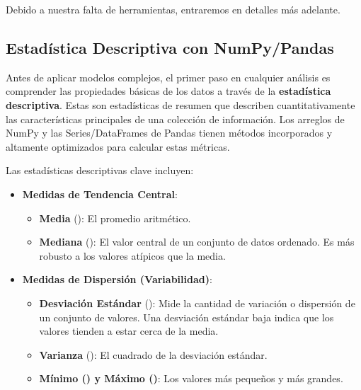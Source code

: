 \noindent Debido a nuestra falta de herramientas, entraremos en detalles más adelante.

\subsection{Estadística Descriptiva con NumPy/Pandas}
\label{subsec:descriptive_stats}
Antes de aplicar modelos complejos, el primer paso en cualquier análisis es comprender las propiedades básicas de los datos a través de la \textbf{estadística descriptiva}. Estas son estadísticas de resumen que describen cuantitativamente las características principales de una colección de información. Los arreglos de NumPy y las Series/DataFrames de Pandas tienen métodos incorporados y altamente optimizados para calcular estas métricas.

Las estadísticas descriptivas clave incluyen:
\begin{itemize}
    \item \textbf{Medidas de Tendencia Central}:
    \begin{itemize}
        \item \textbf{Media} (): El promedio aritmético.
        \item \textbf{Mediana} (): El valor central de un conjunto de datos ordenado. Es más robusto a los valores atípicos que la media.
    \end{itemize}
    \item \textbf{Medidas de Dispersión (Variabilidad)}:
    \begin{itemize}
        \item \textbf{Desviación Estándar} (): Mide la cantidad de variación o dispersión de un conjunto de valores. Una desviación estándar baja indica que los valores tienden a estar cerca de la media.
        \item \textbf{Varianza} (): El cuadrado de la desviación estándar.
        \item \textbf{Mínimo () y Máximo ()}: Los valores más pequeños y más grandes.
    \end{itemize}
\end{itemize}


